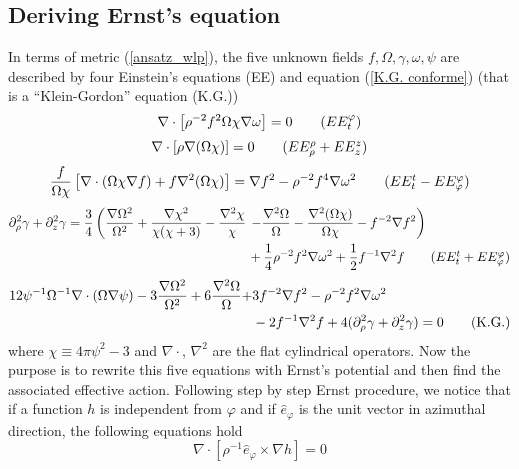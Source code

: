 \subsection{Deriving Ernst's equation}
In terms of metric (\ref{ansatz_wlp}), the five unknown fields $f,\Omega,\gamma, \omega, \psi$ are described by four Einstein's equations (EE) and equation (\ref{K.G. conforme}) (that is a ``Klein-Gordon'' equation (K.G.))
\begin{equation}
        \nabla\cdot \left[\rho^{-2}f^2\Omega\chi\nabla \omega \right] = 0\tag{$EE^{\varphi}_t$}
\end{equation}
\begin{equation}
    \nabla \cdot[\rho\nabla(\Omega\chi)]=0 \tag{$EE^{\rho}_{\rho}+EE^{z}_{z}$}
\end{equation}
\begin{equation}
    \frac{f}{\Omega\chi}\left[\nabla\cdot(\Omega\chi\nabla f) + f\nabla^2(\Omega\chi)\right] = \nabla f^2 - \rho^{-2}f^4\nabla\omega^2 \tag{$EE^t_t- EE^{\varphi}_{\varphi}$}
\end{equation}
\begin{align}
    \partial_{\rho}^2\gamma + \partial_z^2\gamma = \frac{3}{4}\left(\frac{\nabla\Omega^2}{\Omega^2} + \frac{\nabla\chi^2}{\chi(\chi + 3)} -\frac{\nabla^2\chi}{\chi} \right. 
    & \left. - \frac{\nabla^2\Omega}{\Omega} - \frac{\nabla^2(\Omega\chi)}{\Omega\chi} - f^{-2}\nabla f^2 \right) \notag \\
    & + \frac{1}{4}\rho^{-2}f^2\nabla\omega^2 + \frac{1}{2}f^{-1}\nabla^2f \tag{$EE^t_t + EE^{\varphi}_{\varphi}$}
\end{align}
\begin{align}
    12\psi^{-1}\Omega^{-1}\nabla\cdot(\Omega\nabla\psi)-3\frac{\nabla\Omega^2}{\Omega^2} + 6\frac{\nabla^2\Omega}{\Omega}+ &3f^{-2}\nabla f^2 - \rho^{-2}f^2\nabla\omega^2 \notag \\ 
    & -2f^{-1}\nabla^2f + 4(\partial_{\rho}^2\gamma + \partial_z^2\gamma) = 0 \tag{K.G.}
\end{align}
where $\chi \equiv 4\pi \psi^2 -3$ and $\nabla \cdot$, $\nabla^2$ are the flat cylindrical operators.
Now the purpose is to rewrite this five equations with Ernst's potential and then find the associated effective action. Following step by step Ernst procedure, we notice that if a function $h$ is independent from $\varphi$ and if $\hat{e}_{\varphi}$ is the unit vector in azimuthal direction, the following equations hold
\begin{equation}
    \nabla\cdot[\rho^{-1}\hat{e}_{\varphi} \times \nabla h]=0
    \label{proprietà azimutale}
\end{equation}
